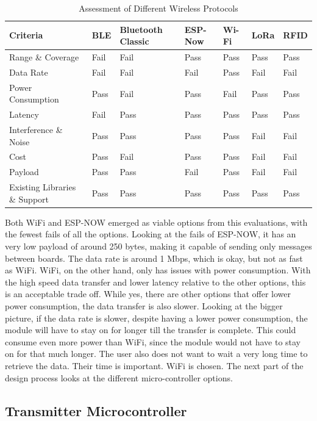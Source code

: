 \documentclass[class=report,11pt,crop=false]{standalone}
\begin{document}
\begin{table}[h]
\centering
\begin{tabular}{|l|l|l|l|l|l|l|}
\hline
\textbf{Criteria} & \textbf{BLE} & \textbf{Bluetooth Classic} & \textbf{ESP-Now} & \textbf{Wi-Fi} & \textbf{LoRa} & \textbf{RFID} \\
\hline
Range \& Coverage & Fail & Fail & Pass & Pass & Pass & Pass \\
\hline
Data Rate & Fail & Fail & Fail & Pass & Fail & Fail \\
\hline
Power Consumption & Pass & Fail & Pass & Fail & Pass & Pass \\
\hline
Latency & Fail & Pass & Pass & Pass & Pass & Pass \\
\hline
Interference \& Noise & Pass & Pass & Pass & Pass & Fail & Fail \\
\hline
Cost & Pass & Fail & Pass & Pass & Fail & Fail \\
\hline
Payload & Pass & Pass & Fail & Pass & Fail & Fail \\
\hline
Existing Libraries \& Support & Pass & Pass & Pass & Pass & Pass & Pass \\
\hline
\end{tabular}
\caption{Assessment of Different Wireless Protocols}
\label{tab:wireless_protocol_assessment}
\end{table}
Both WiFi and ESP-NOW emerged as viable options from this evaluations, with the fewest fails of all the options. Looking at the fails of ESP-NOW, it has an very low payload of around 250 bytes, making it capable of sending only messages between boards. The data rate is around 1 Mbps, which is okay, but not as fast as WiFi. 
WiFi, on the other hand, only has issues with power consumption. With the high speed data transfer and lower latency relative to the other options, this is an acceptable trade off. While yes, there are other options that offer lower power consumption, the data transfer is also slower. Looking at the bigger picture, if the data rate is slower, despite having a lower power consumption, the module will have to stay on for longer till the transfer is complete. This could consume even more power than WiFi, since the module would not have to stay on for that much longer. 
The user also does not want to wait a very long time to retrieve the data. Their time is important. WiFi is chosen. The next part of the design process looks at the different micro-controller options. 

\subsection{Transmitter Microcontroller}
\end{document}

